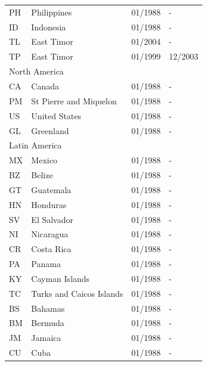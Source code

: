 \begin{footnotesize}
\begin{longtable}{p{0.5cm}p{9cm}p{2cm}p{2cm}}
PH	&	Philippines	&	01/1988	&	-	\\

ID	&	Indonesia	&	01/1988	&	-	\\

TL	&	East Timor	&	01/2004	&	-	\\

TP	&	East Timor	&	01/1999	&	12/2003	\\

\midrule
\multicolumn{3}{l}{North America}	&	\\
CA	&	Canada	&	01/1988	&	-	\\

PM	&	St Pierre and Miquelon	&	01/1988	&	-	\\

US	&	United States	&	01/1988	&	-	\\

GL	&	Greenland	&	01/1988	&	-	\\

\midrule
\multicolumn{3}{l}{Latin America}	&	\\
MX	&	Mexico	&	01/1988	&	-	\\

BZ	&	Belize	&	01/1988	&	-	\\

GT	&	Guatemala	&	01/1988	&	-	\\

HN	&	Honduras	&	01/1988	&	-	\\

SV	&	El Salvador	&	01/1988	&	-	\\

NI	&	Nicaragua	&	01/1988	&	-	\\

CR	&	Costa Rica	&	01/1988	&	-	\\

PA	&	Panama	&	01/1988	&	-	\\

KY	&	Cayman Islands	&	01/1988	&	-	\\

TC	&	Turks and Caicos Islands	&	01/1988	&	-	\\

BS	&	Bahamas	&	01/1988	&	-	\\

BM	&	Bermuda	&	01/1988	&	-	\\

JM	&	Jamaica	&	01/1988	&	-	\\

CU	&	Cuba	&	01/1988	&	-	\\


\end{longtable}
\end{footnotesize}

